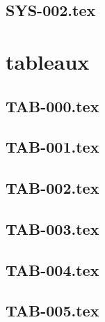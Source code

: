 \renewcommand{\xxexo}{SYS-002.tex} 
\subsection*{\xxexo} 
\graphicspath{{../../exos/systemes/SYS-002/}}
 
 
\section*{tableaux}
\renewcommand{\xxexo}{TAB-000.tex} 
\subsection*{\xxexo} 
\graphicspath{{../../exos/tableaux/TAB-000/}}
 
 
\renewcommand{\xxexo}{TAB-001.tex} 
\subsection*{\xxexo} 
\graphicspath{{../../exos/tableaux/TAB-001/}}
 
 
\renewcommand{\xxexo}{TAB-002.tex} 
\subsection*{\xxexo} 
\graphicspath{{../../exos/tableaux/TAB-002/}}
 
 
\renewcommand{\xxexo}{TAB-003.tex} 
\subsection*{\xxexo} 
\graphicspath{{../../exos/tableaux/TAB-003/}}
 
 
\renewcommand{\xxexo}{TAB-004.tex} 
\subsection*{\xxexo} 
\graphicspath{{../../exos/tableaux/TAB-004/}}
 
 
\renewcommand{\xxexo}{TAB-005.tex} 
\subsection*{\xxexo} 
\graphicspath{{../../exos/tableaux/TAB-005/}}
 
 
\renewcommand{\xxexo}{TAB-006.tex} 
